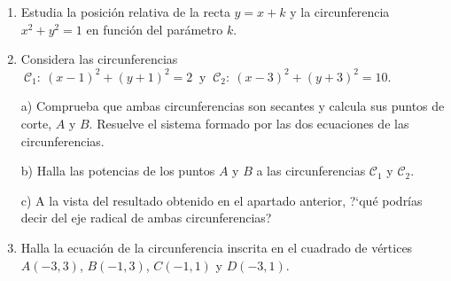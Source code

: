 \begin{enumerate}
\item Estudia la posición relativa de la recta $y = x + k$ y la circunferencia $x^2 + y^2 = 1$ en función del parámetro $k$.

\vspace{-6mm}
\begin{flushright}
\begin{footnotesize} \textcolor{gris}{\rotatebox{180}{$k=\pm \sqrt{2} \ \to \ \text{ tangente}; \qquad k\in ]-\sqrt{2},\sqrt{2}[ \ \to \ \text{ secante}$; $\qquad$ otros casos: exterior.  }}	\end{footnotesize}
\end{flushright}

\item Considera las circunferencias $\ \mathcal C_1:\  (x - 1)^2 + ( y + 1)^2 = 2 \  \text{ y } \ \mathcal C_2:\  (x - 3)^2 + ( y + 3)^2 = 10$.

a) Comprueba que ambas circunferencias son secantes y calcula sus puntos de corte, $A$ y $B$. \textcolor{gris}{Resuelve el sistema formado por las dos ecuaciones de las circunferencias.}

b) Halla las potencias de los puntos $A$ y $B$ a las circunferencias $\mathcal C_1$ y $\mathcal C_2$.

c) A la vista del resultado obtenido en el apartado anterior, ?`qué podrías decir del eje radical de ambas circunferencias?

\vspace{-6mm}
\begin{flushright}
\begin{tiny} \textcolor{gris}{}	\end{tiny}
\end{flushright}

\item  Halla la ecuación de la circunferencia inscrita en el cuadrado de vértices $A(-3, 3)$, $B(-1, 3)$, $C(-1, 1)$ y $D(-3, 1)$.

\vspace{-6mm}
\begin{flushright}
\begin{footnotesize} \textcolor{gris}{}	\end{footnotesize}
\end{flushright}

\end{enumerate}

